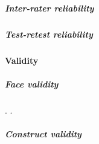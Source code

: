 \subparagraph{Inter-rater reliability}
\lipsum[10]

\subparagraph{Test-retest reliability}
\lipsum[11]

\paragraph{Validity}
\lipsum[12]

\subparagraph{Face validity}
\lipsum[13]. .

\lipsum[41]

\subparagraph{Construct validity}

\lipsum[24]